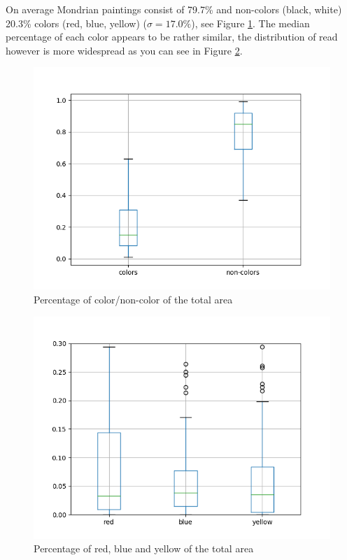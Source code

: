 \documentclass[serif,article,noparskip]{agse-thesis}
\begin{document}
On average Mondrian paintings consist of 79.7\%  and non-colors (black, white)
20.3\% colors (red, blue, yellow) ($\sigma = 17.0\%$), see Figure
\ref{fig:colors-noncolors}. The median percentage of each color appears to be
rather similar, the distribution of read however is more widespread as you can
see in Figure \ref{fig:colors-rby}.

\begin{figure}
\includegraphics[width=\linewidth]{images/colors-non-colors.png}
\caption{Percentage of color/non-color of the total area}
\label{fig:colors-noncolors}
\end{figure}

\begin{figure}
\includegraphics[width=\linewidth]{images/colors-rby.png}
\caption{Percentage of red, blue and yellow of the total area}
\label{fig:colors-rby}
\end{figure}
\end{document}
